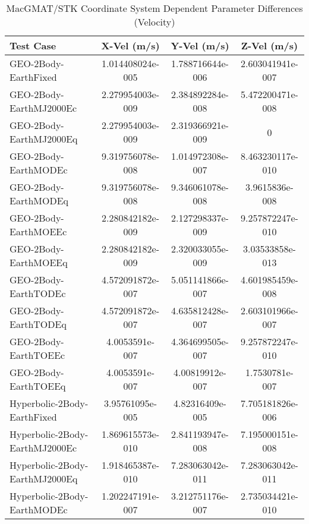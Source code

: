 \begin{table}[htbp!]
\centering
\caption{ MacGMAT/STK Coordinate System Dependent Parameter Differences (Velocity)}
      \begin{tabular}{lccc}
      \hline\hline
          Test Case & X-Vel (m/s) & Y-Vel (m/s) & Z-Vel (m/s) \\
         \hline
         GEO-2Body-EarthFixed & 1.014408024e-005 & 1.788716644e-006 & 2.603041941e-007 \\
         GEO-2Body-EarthMJ2000Ec & 2.279954003e-009 & 2.384892284e-008 & 5.472200471e-008 \\
         GEO-2Body-EarthMJ2000Eq & 2.279954003e-009 & 2.319366921e-009 & 0 \\
         GEO-2Body-EarthMODEc & 9.319756078e-008 & 1.014972308e-007 & 8.463230117e-010 \\
         GEO-2Body-EarthMODEq & 9.319756078e-008 & 9.346061078e-008 & 3.9615836e-008 \\
         GEO-2Body-EarthMOEEc & 2.280842182e-009 & 2.127298337e-009 & 9.257872247e-010 \\
         GEO-2Body-EarthMOEEq & 2.280842182e-009 & 2.320033055e-009 & 3.03533858e-013 \\
         GEO-2Body-EarthTODEc & 4.572091872e-007 & 5.051141866e-007 & 4.601985459e-008 \\
         GEO-2Body-EarthTODEq & 4.572091872e-007 & 4.635812428e-007 & 2.603101966e-007 \\
         GEO-2Body-EarthTOEEc & 4.0053591e-007 & 4.364699505e-007 & 9.257872247e-010 \\
         GEO-2Body-EarthTOEEq & 4.0053591e-007 & 4.00819912e-007 & 1.7530781e-007 \\
         Hyperbolic-2Body-EarthFixed & 3.95761095e-005 & 4.82316409e-005 & 7.705181826e-006 \\
         Hyperbolic-2Body-EarthMJ2000Ec & 1.869615573e-010 & 2.841193947e-008 & 7.195000151e-008 \\
         Hyperbolic-2Body-EarthMJ2000Eq & 1.918465387e-010 & 7.283063042e-011 & 7.283063042e-011 \\
         Hyperbolic-2Body-EarthMODEc & 1.202247191e-007 & 3.212751176e-007 & 2.735034421e-010 \\

\end{tabular}
\end{table}
